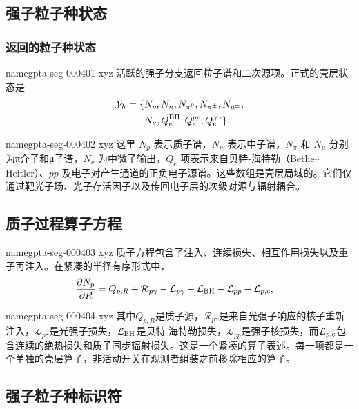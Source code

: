 \documentclass[twocolumn]{aastex702}
\makeatletter
\providecommand{\gptareaderanchor}[1]{\pdfdest name{#1} xyz}%
\providecommand{\gptareaderanchor}[1]{\special{pdf:dest (#1) [ @thispage /XYZ @xpos @ypos null ]}}%
\makeatother
\begin{document}
\subsection{强子粒子种状态}

\subsubsection{返回的粒子种状态}


\gptareaderanchor{gpta-seg-000401}%
活跃的强子分支返回粒子谱和二次源项。正式的壳层状态是
\begin{equation}
\begin{aligned}
{\cal Y}_h=\{&
N_p,N_n,N_{\pi^0},N_{\pi^\pm},N_{\mu^\pm},\\
&N_\nu,Q_e^{\rm BH},Q_e^{pp},Q_e^{\gamma\gamma}\}.
\end{aligned}
\end{equation}

\gptareaderanchor{gpta-seg-000402}%
这里 \(N_p\) 表示质子谱，\(N_n\) 表示中子谱，\(N_\pi\) 和 \(N_\mu\) 分别为π介子和μ子谱，\(N_\nu\) 为中微子输出，\(Q_e\) 项表示来自贝特-海特勒（Bethe–Heitler）、\(pp\) 及电子对产生通道的正负电子源谱。这些数组是壳层局域的。它们仅通过靶光子场、光子存活因子以及传回电子层的次级对源与辐射耦合。

\subsection{质子过程算子方程}


\gptareaderanchor{gpta-seg-000403}%
质子方程包含了注入、连续损失、相互作用损失以及重子再注入。在紧凑的半径有序形式中，
\begin{equation}
\begin{aligned}
\frac{\partial N_p}{\partial R}
&=Q_{p,R}
+\mathcal{R}_{p\gamma}
-\mathcal{L}_{p\gamma}
-\mathcal{L}_{\rm BH}
-\mathcal{L}_{pp}
-\mathcal{L}_{p,{\rm c}},
\end{aligned}
\end{equation}

\gptareaderanchor{gpta-seg-000404}%
其中\(Q_{p,R}\)是质子源，\(\mathcal{R}_{p\gamma}\)是来自光强子响应的核子重新注入，\(\mathcal{L}_{p\gamma}\)是光强子损失，\(\mathcal{L}_{\rm BH}\)是贝特-海特勒损失，\(\mathcal{L}_{pp}\)是强子核损失，而\(\mathcal{L}_{p,{\rm c}}\)包含连续的绝热损失和质子同步辐射损失。这是一个紧凑的算子表述。每一项都是一个单独的壳层算子，非活动开关在观测者组装之前移除相应的算子。

\subsection{强子粒子种标识符}
\end{document}
